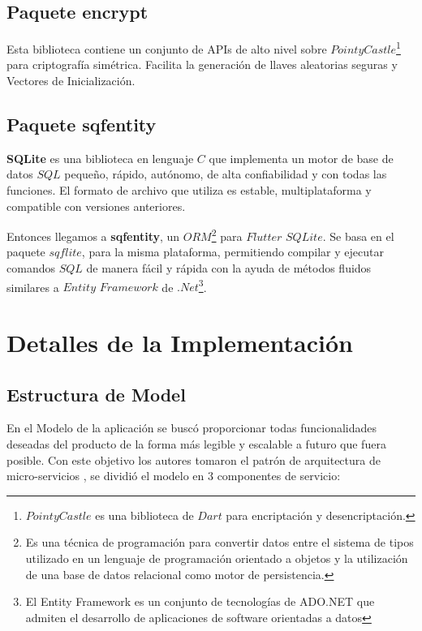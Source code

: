 \subsection{Paquete encrypt}
Esta biblioteca contiene un conjunto de APIs de alto nivel sobre $PointyCastle$\footnote{$PointyCastle$ es una biblioteca de $Dart$ para encriptación y desencriptación.} para criptografía simétrica. Facilita la generación de llaves aleatorias seguras y Vectores de Inicialización.


\subsection{Paquete sqfentity}
\textbf{SQLite} es una biblioteca en lenguaje $C$ que implementa un motor de base de datos $SQL$ pequeño, rápido, autónomo, de alta confiabilidad y con todas las funciones. El formato de archivo que utiliza es estable, multiplataforma y compatible con versiones anteriores.
 
Entonces llegamos a \textbf{sqfentity}, un $ORM$\footnote{Es una técnica de programación para convertir datos entre el sistema de tipos utilizado en un lenguaje de programación orientado a objetos y la utilización de una base de datos relacional como motor de persistencia.}  para $Flutter$ $SQLite$. Se basa en el paquete $sqflite$, para la misma plataforma, permitiendo compilar y ejecutar comandos $SQL$ de manera fácil y rápida con la ayuda de métodos fluidos similares a $Entity$ $Framework$ de $.Net$\footnote{El Entity Framework es un conjunto de tecnologías de ADO.NET que admiten el desarrollo de aplicaciones de software orientadas a datos}.

\section{Detalles de la Implementación}
\label{chapter:implementation}

\subsection{Estructura de Model}

En el Modelo de la aplicación se buscó proporcionar todas funcionalidades deseadas del producto de la forma más legible y escalable a futuro que fuera posible. Con este objetivo los autores tomaron el patrón de arquitectura de micro-servicios , se dividió el modelo en 3 componentes de servicio: 

